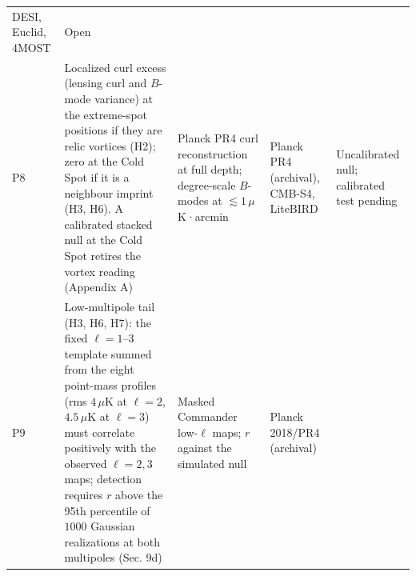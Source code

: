 \documentclass[
]{article}
\begin{document}
\begin{longtable}[]{@{}lllll@{}}
\begin{minipage}[t]{0.19\columnwidth}
DESI, Euclid, 4MOST\strut
\end{minipage} & \begin{minipage}[t]{0.19\columnwidth}\raggedright
Open\strut
\end{minipage}\tabularnewline
\begin{minipage}[t]{0.11\columnwidth}\raggedright
P8\strut
\end{minipage} & \begin{minipage}[t]{0.19\columnwidth}\raggedright
Localized curl excess (lensing curl and \(B\)-mode variance) at the
extreme-spot positions if they are relic vortices (H2); zero at the Cold
Spot if it is a neighbour imprint (H3, H6). A calibrated stacked null at
the Cold Spot retires the vortex reading (Appendix A)\strut
\end{minipage} & \begin{minipage}[t]{0.19\columnwidth}\raggedright
Planck PR4 curl reconstruction at full depth; degree-scale \(B\)-modes
at \(\lesssim 1\,\mu\)K·arcmin\strut
\end{minipage} & \begin{minipage}[t]{0.19\columnwidth}\raggedright
Planck PR4 (archival), CMB-S4, LiteBIRD\strut
\end{minipage} & \begin{minipage}[t]{0.19\columnwidth}\raggedright
Uncalibrated null; calibrated test pending\strut
\end{minipage}\tabularnewline
\begin{minipage}[t]{0.11\columnwidth}\raggedright
P9\strut
\end{minipage} & \begin{minipage}[t]{0.19\columnwidth}\raggedright
Low-multipole tail (H3, H6, H7): the fixed \(\ell = 1\)--\(3\) template
summed from the eight point-mass profiles (rms \(4\,\mu\)K at
\(\ell = 2\), \(4.5\,\mu\)K at \(\ell = 3\)) must correlate positively
with the observed \(\ell = 2, 3\) maps; detection requires \(r\) above
the 95th percentile of \(1000\) Gaussian realizations at both multipoles
(Sec. 9d)\strut
\end{minipage} & \begin{minipage}[t]{0.19\columnwidth}\raggedright
Masked Commander low-\(\ell\) maps; \(r\) against the simulated
null\strut
\end{minipage} & \begin{minipage}[t]{0.19\columnwidth}\raggedright
Planck 2018/PR4 (archival)\strut
\end{minipage} & \begin{minipage}[t]{0.19\columnwidth}\raggedright

\end{minipage}
\end{longtable}
\end{document}
